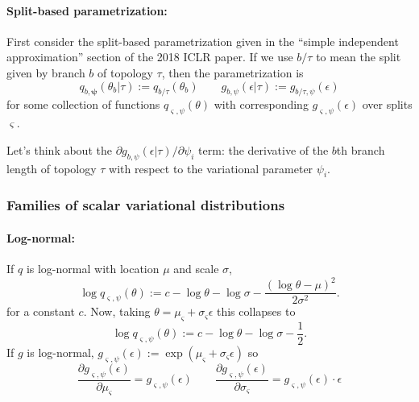 \documentclass{article}
\begin{document}
\paragraph{Split-based parametrization:}
First consider the split-based parametrization given in the ``simple independent approximation'' section of the 2018 ICLR paper.
If we use $b / \tau$ to mean the split given by branch $b$ of topology $\tau$, then the parametrization is
\[
q_{b, \bm{\psi}}(\theta_b | \tau) := q_{b / \tau}(\theta_b)
\qquad
g_{b,\psi}(\epsilon | \tau) := g_{b / \tau,\psi}(\epsilon)
\]
for some collection of functions $q_{\varsigma, \psi}(\theta)$ with corresponding $g_{\varsigma,\psi}(\epsilon)$ over splits $\varsigma$.

Let's think about the $\partial g_{b,\psi}(\epsilon | \tau) / \partial \psi_i$ term: the derivative of the $b$th branch length of topology $\tau$ with respect to the variational parameter $\psi_i$.


\subsubsection*{Families of scalar variational distributions}
\paragraph{Log-normal:}
If $q$ is log-normal with location $\mu$ and scale $\sigma$,
\[
\log q_{\varsigma, \psi}(\theta) := c - \log \theta - \log \sigma - \frac{(\log \theta - \mu)^2}{2 \sigma^2}.
\]
for a constant $c$.
Now, taking $\theta = \mu_\varsigma + \sigma_\varsigma \epsilon$ this collapses to
\[
\log q_{\varsigma, \psi}(\theta) := c - \log \theta - \log \sigma - \frac{1}{2}.
\]
If $g$ is log-normal,
$g_{\varsigma,\psi}(\epsilon) := \exp(\mu_\varsigma + \sigma_\varsigma \epsilon)$
so
\begin{equation}
    \frac{\partial g_{\varsigma,\psi}(\epsilon)}{\partial \mu_\varsigma} = g_{\varsigma,\psi}(\epsilon)
    \qquad
    \frac{\partial g_{\varsigma,\psi}(\epsilon)}{\partial \sigma_\varsigma} = g_{\varsigma,\psi}(\epsilon) \cdot \epsilon
\end{equation}


\nocite{vbpi}



\end{document}
